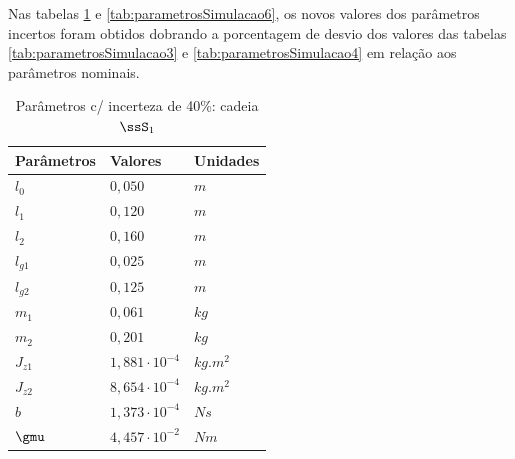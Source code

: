 \documentclass[]{politex}
\begin{document}
Nas tabelas \ref{tab:parametrosSimulacao5} e \ref{tab:parametrosSimulacao6}, os novos valores dos parâmetros incertos foram obtidos dobrando a porcentagem de desvio dos valores das tabelas \ref{tab:parametrosSimulacao3} e \ref{tab:parametrosSimulacao4} em relação aos parâmetros nominais.
\begin{multicols}{2}
\begin{table}[H] 
\centering
\caption{Parâmetros c/ incerteza de 40\%: cadeia $\ssS_1$}
\label{tab:parametrosSimulacao5}
\begin{tabular}{l|l|l}
Parâmetros   & Valores                  & Unidades      \\ \hline
$l_0$        & $0{,}050$                     & $m$        \\
$l_1$        & $0{,}120$                     & $m$        \\
$l_2$        & $0{,}160$                     & $m$        \\
$l_{g1}$     & $0{,}025$                     & $m$        \\
$l_{g2}$     & $0{,}125$                     & $m$        \\
$m_1$        & $0{,}061$                     & $kg$       \\
$m_2$        & $0{,}201$                     & $kg$       \\
$J_{z1}$     & $1{,}881 \cdot 10^{-4}$       & $kg.m^{2}$ \\
$J_{z2}$     & $8{,}654 \cdot 10^{-4}$       & $kg.m^{2}$ \\
$b$          & $1{,}373 \cdot 10^{-4}$       & $N s$      \\
$\gmu$       & $4{,}457 \cdot 10^{-2}$       & $Nm$        \\
\end{tabular}
\end{table} 


\end{multicols}
\end{document}

